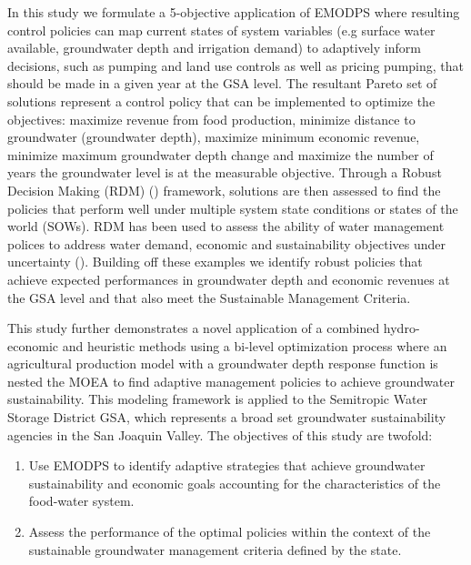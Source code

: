 \documentclass[11pt,a4paper]{article}
\begin{document}
In this study we formulate a 5-objective application of EMODPS where resulting control policies can map current states of system variables (e.g surface water available, groundwater depth and irrigation demand) to adaptively inform decisions, such as pumping and land use controls as well as pricing pumping, that should be made in a given year at the GSA level. The resultant Pareto set of solutions represent a control policy that can be implemented to optimize the objectives: maximize revenue from food production, minimize distance to groundwater (groundwater depth), maximize minimum economic revenue, minimize maximum groundwater depth change and maximize the number of years the groundwater level is at the measurable objective. Through a Robust Decision Making (RDM) (\cite{groves_robust_2019,lempert_making_2013}) framework, solutions are then assessed to find the policies that perform well under multiple system state conditions or states of the world (SOWs). RDM has been used to assess the ability of water management polices to address water demand, economic and sustainability objectives under uncertainty (\cite{graveline_combining_2020,huskova_screening_2016,miro_adaptive_2021,hadjimichael_defining_2020}). Building off these examples we identify robust policies that achieve expected performances in groundwater depth and economic revenues at the GSA level and that also meet the Sustainable Management Criteria. 

This study further demonstrates a novel application of a combined hydro-economic and heuristic methods using a bi-level optimization process where an agricultural production model with a groundwater depth response function is nested the MOEA to find adaptive management policies to achieve groundwater sustainability. This modeling framework is applied to the Semitropic Water Storage District GSA, which represents a broad set groundwater sustainability agencies in the San Joaquin Valley. The objectives of this study are twofold:  

\begin{enumerate}
    \item  Use EMODPS to identify adaptive strategies that achieve groundwater sustainability and economic goals accounting for the characteristics of the food-water system. 
    
    \item Assess the performance of the optimal policies within the context of the sustainable groundwater management criteria defined by the state.
\end{enumerate}
\end{document}
